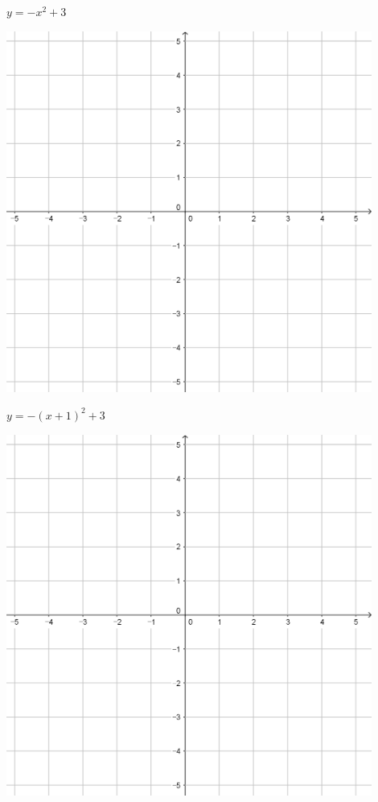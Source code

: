 \documentclass[a4paper]{oblivoir}
\begin{document}
\begin{minipage}{0.45\textwidth}\centering
\(y=-x^2+3\)
\par\bigskip\includegraphics[width=0.9\textwidth]{55}
\end{minipage}
\begin{minipage}{0.45\textwidth}\centering
\(y=-(x+1)^2+3\)
\par\bigskip\includegraphics[width=0.9\textwidth]{55}
\end{minipage}\bigskip\bigskip\par
\end{document}
